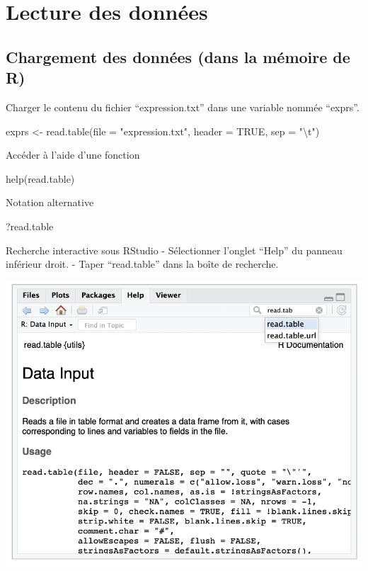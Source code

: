 \documentclass[
]{book}
\newenvironment{Shaded}{\begin{snugshade}}{\end{snugshade}}
\newcommand{\AttributeTok}[1]{\textcolor[rgb]{0.77,0.63,0.00}{#1}}
\newcommand{\ConstantTok}[1]{\textcolor[rgb]{0.00,0.00,0.00}{#1}}
\newcommand{\FunctionTok}[1]{\textcolor[rgb]{0.00,0.00,0.00}{#1}}
\newcommand{\NormalTok}[1]{#1}
\newcommand{\OtherTok}[1]{\textcolor[rgb]{0.56,0.35,0.01}{#1}}
\newcommand{\SpecialCharTok}[1]{\textcolor[rgb]{0.00,0.00,0.00}{#1}}
\newcommand{\StringTok}[1]{\textcolor[rgb]{0.31,0.60,0.02}{#1}}
\begin{document}
\hypertarget{lecture-des-donnuxe9es}{%
\chapter{Lecture des données}\label{lecture-des-donnuxe9es}}

\hypertarget{chargement-des-donnuxe9es-dans-la-muxe9moire-de-r}{%
\section{Chargement des données (dans la mémoire de R)}\label{chargement-des-donnuxe9es-dans-la-muxe9moire-de-r}}

Charger le contenu du fichier ``expression.txt'' dans une variable nommée ``exprs''.

\begin{Shaded}
\begin{Highlighting}[]
\NormalTok{exprs }\OtherTok{\textless{}{-}} \FunctionTok{read.table}\NormalTok{(}\AttributeTok{file =} \StringTok{"expression.txt"}\NormalTok{, }\AttributeTok{header =} \ConstantTok{TRUE}\NormalTok{, }\AttributeTok{sep =} \StringTok{"}\SpecialCharTok{\textbackslash{}t}\StringTok{"}\NormalTok{)}
\end{Highlighting}
\end{Shaded}

Accéder à l'aide d'une fonction

\begin{Shaded}
\begin{Highlighting}[]
\FunctionTok{help}\NormalTok{(read.table)}
\end{Highlighting}
\end{Shaded}

Notation alternative

\begin{Shaded}
\begin{Highlighting}[]
\NormalTok{?read.table}
\end{Highlighting}
\end{Shaded}

Recherche interactive sous RStudio
- Sélectionner l'onglet ``Help'' du panneau inférieur droit.
- Taper ``read.table'' dans la boîte de recherche.

\includegraphics{images/help.png}
\end{document}
